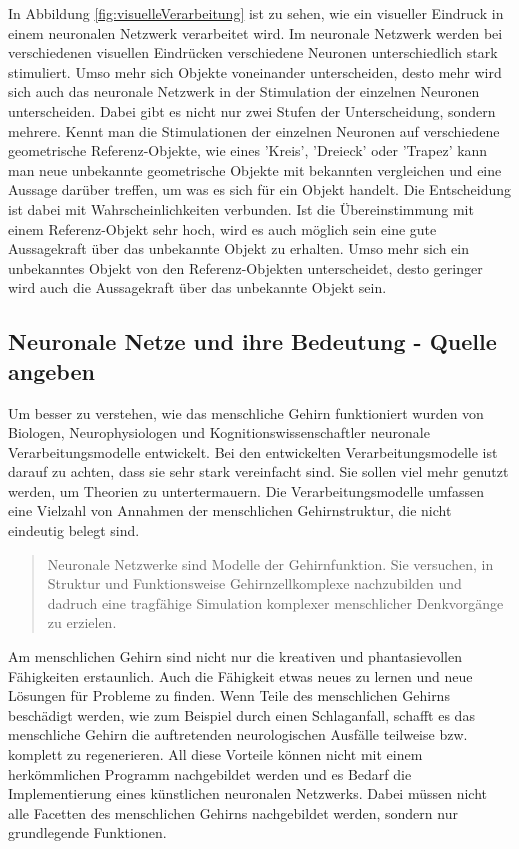 In Abbildung \ref{fig:visuelleVerarbeitung} ist zu sehen, wie ein visueller Eindruck in einem neuronalen Netzwerk verarbeitet wird. Im neuronale Netzwerk werden bei verschiedenen visuellen Eindrücken verschiedene Neuronen unterschiedlich stark stimuliert. Umso mehr sich Objekte voneinander unterscheiden, desto mehr wird sich auch das neuronale Netzwerk in der Stimulation der einzelnen Neuronen unterscheiden. Dabei gibt es nicht nur zwei Stufen der Unterscheidung, sondern mehrere. Kennt man die Stimulationen der einzelnen Neuronen auf verschiedene geometrische Referenz-Objekte, wie eines 'Kreis', 'Dreieck' oder 'Trapez' kann man neue unbekannte geometrische Objekte mit bekannten vergleichen und eine Aussage darüber treffen, um was es sich für ein Objekt handelt. Die Entscheidung ist dabei mit Wahrscheinlichkeiten verbunden. Ist die Übereinstimmung mit einem Referenz-Objekt sehr hoch, wird es auch möglich sein eine gute Aussagekraft über das unbekannte Objekt zu erhalten. Umso mehr sich ein unbekanntes Objekt von den Referenz-Objekten unterscheidet, desto geringer wird auch die Aussagekraft über das unbekannte Objekt sein.

\subsection{Neuronale Netze und ihre Bedeutung - Quelle angeben}
Um besser zu verstehen, wie das menschliche Gehirn funktioniert wurden von Biologen, Neurophysiologen und Kognitionswissenschaftler neuronale Verarbeitungsmodelle entwickelt. Bei den entwickelten Verarbeitungsmodelle ist darauf zu achten, dass sie sehr stark vereinfacht sind. Sie sollen viel mehr genutzt werden, um Theorien zu untertermauern. Die Verarbeitungsmodelle umfassen eine Vielzahl von Annahmen der menschlichen Gehirnstruktur, die nicht eindeutig belegt sind.

\begin{quote}
    Neuronale Netzwerke sind Modelle der Gehirnfunktion. Sie versuchen, in Struktur und Funktionsweise Gehirnzellkomplexe nachzubilden und dadruch eine tragfähige Simulation komplexer menschlicher Denkvorgänge zu erzielen. \cite[S. 12]{Kratzer1991} 
\end{quote}

Am menschlichen Gehirn sind nicht nur die kreativen und phantasievollen Fähigkeiten erstaunlich. Auch die Fähigkeit etwas neues zu lernen und neue Lösungen für Probleme zu finden. Wenn Teile des menschlichen Gehirns beschädigt werden, wie zum Beispiel durch einen Schlaganfall, schafft es das menschliche Gehirn die auftretenden neurologischen Ausfälle teilweise bzw. komplett zu regenerieren. All diese Vorteile können nicht mit einem herkömmlichen Programm nachgebildet werden und es Bedarf die Implementierung eines künstlichen neuronalen Netzwerks. Dabei müssen nicht alle Facetten des menschlichen Gehirns nachgebildet werden, sondern nur grundlegende Funktionen.

